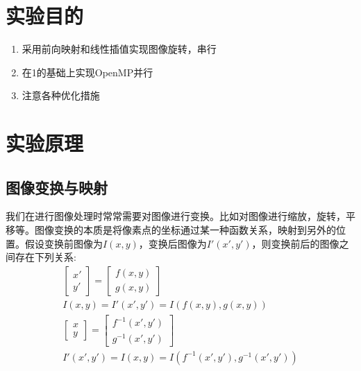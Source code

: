 \documentclass[UTF-8, a4paper, 12pt]{ctexart}
\begin{document}




     

     
\tableofcontents\thispagestyle{empty}
\newpage
\setcounter{page}{1}        %

\section{实验目的}
\begin{enumerate}
    \item 采用前向映射和线性插值实现图像旋转，串行
    \item 在1的基础上实现OpenMP并行
    \item 注意各种优化措施
\end{enumerate}

\section{实验原理}

\subsection{图像变换与映射}
我们在进行图像处理时常常需要对图像进行变换。比如对图像进行缩放，旋转，平移等。图像变换的本质是将像素点的坐标通过某一种函数关系，映射到另外的位置。假设变换前图像为$I(x,y)$，变换后图像为$I'(x',y')$，则变换前后的图像之间存在下列关系:
\begin{gather}
    \left[\begin{array}{c}
        x'\\y'
    \end{array}\right]=
    \left[\begin{array}{c}
        f(x,y)\\g(x,y)
    \end{array}\right]\label{e1}\\
     I(x,y)=I'(x',y')=I\left(f(x,y),g(x,y)\right)\label{e2}\\
     \left[\begin{array}{c}
        x\\y
    \end{array}\right]=
    \left[\begin{array}{c}
        f^{-1}(x',y')\\g^{-1}(x',y')
    \end{array}\right]\label{e3}\\
    I'(x',y')=I(x,y)=I\left(f^{-1}(x',y'),g^{-1}(x',y')\right)\label{e4}
\end{gather}
\end{document}

